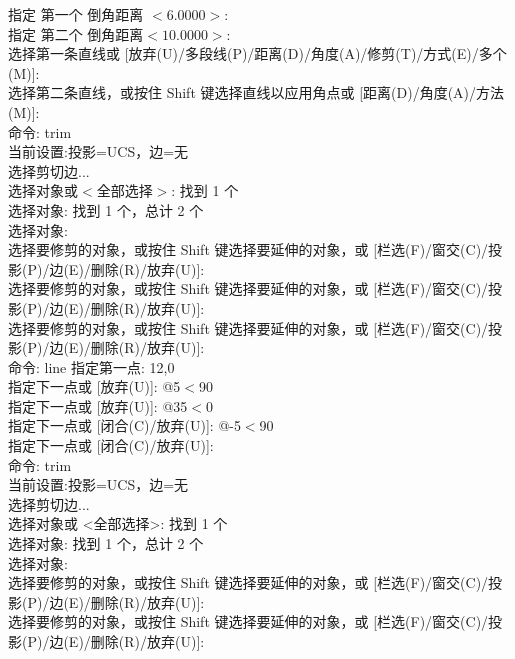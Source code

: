 指定 第一个 倒角距离 $<6.0000>$: \\
指定 第二个 倒角距离$<10.0000>$:\\
选择第一条直线或 [放弃(U)/多段线(P)/距离(D)/角度(A)/修剪(T)/方式(E)/多个(M)]:\\
选择第二条直线，或按住 Shift 键选择直线以应用角点或 [距离(D)/角度(A)/方法(M)]:\\
命令: trim\\
当前设置:投影=UCS，边=无\\
选择剪切边...\\
选择对象或$<$全部选择$>$:  找到 1 个\\
选择对象: 找到 1 个，总计 2 个\\
选择对象:\\
选择要修剪的对象，或按住 Shift 键选择要延伸的对象，或
[栏选(F)/窗交(C)/投影(P)/边(E)/删除(R)/放弃(U)]:\\
选择要修剪的对象，或按住 Shift 键选择要延伸的对象，或
[栏选(F)/窗交(C)/投影(P)/边(E)/删除(R)/放弃(U)]:\\
选择要修剪的对象，或按住 Shift 键选择要延伸的对象，或
[栏选(F)/窗交(C)/投影(P)/边(E)/删除(R)/放弃(U)]:\\
命令: line 指定第一点: 12,0\\
指定下一点或 [放弃(U)]: @5$<$90\\
指定下一点或 [放弃(U)]: @35$<$0\\
指定下一点或 [闭合(C)/放弃(U)]:   @-5$<$90\\
指定下一点或 [闭合(C)/放弃(U)]:\\
命令: trim\\
当前设置:投影=UCS，边=无\\
选择剪切边...\\
选择对象或 <全部选择>:  找到 1 个\\
选择对象: 找到 1 个，总计 2 个\\
选择对象:\\
选择要修剪的对象，或按住 Shift 键选择要延伸的对象，或
[栏选(F)/窗交(C)/投影(P)/边(E)/删除(R)/放弃(U)]:\\
选择要修剪的对象，或按住 Shift 键选择要延伸的对象，或
[栏选(F)/窗交(C)/投影(P)/边(E)/删除(R)/放弃(U)]:\\
\indent

\endinput
